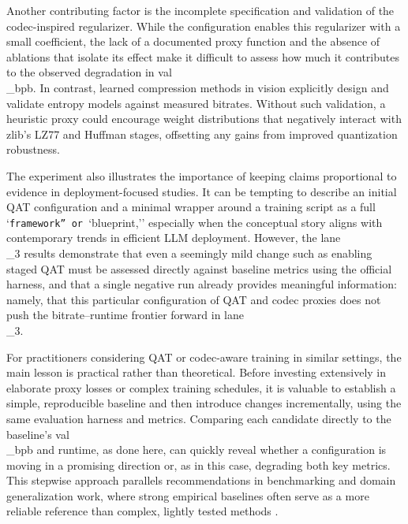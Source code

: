 \documentclass{article}
\begin{document}
Another contributing factor is the incomplete specification and validation of the codec-inspired regularizer. While the configuration enables this regularizer with a small coefficient, the lack of a documented proxy function and the absence of ablations that isolate its effect make it difficult to assess how much it contributes to the observed degradation in val\\_bpb. In contrast, learned compression methods in vision explicitly design and validate entropy models against measured bitrates. Without such validation, a heuristic proxy could encourage weight distributions that negatively interact with zlib's LZ77 and Huffman stages, offsetting any gains from improved quantization robustness.

The experiment also illustrates the importance of keeping claims proportional to evidence in deployment-focused studies. It can be tempting to describe an initial QAT configuration and a minimal wrapper around a training script as a full `\texttt{framework'' or }`blueprint,'' especially when the conceptual story aligns with contemporary trends in efficient LLM deployment. However, the lane\\_3 results demonstrate that even a seemingly mild change such as enabling staged QAT must be assessed directly against baseline metrics using the official harness, and that a single negative run already provides meaningful information: namely, that this particular configuration of QAT and codec proxies does not push the bitrate--runtime frontier forward in lane\\_3.

For practitioners considering QAT or codec-aware training in similar settings, the main lesson is practical rather than theoretical. Before investing extensively in elaborate proxy losses or complex training schedules, it is valuable to establish a simple, reproducible baseline and then introduce changes incrementally, using the same evaluation harness and metrics. Comparing each candidate directly to the baseline's val\\_bpb and runtime, as done here, can quickly reveal whether a configuration is moving in a promising direction or, as in this case, degrading both key metrics. This stepwise approach parallels recommendations in benchmarking and domain generalization work, where strong empirical baselines often serve as a more reliable reference than complex, lightly tested methods \cite{teterwak2023improved, liu2022bond}.
\end{document}

